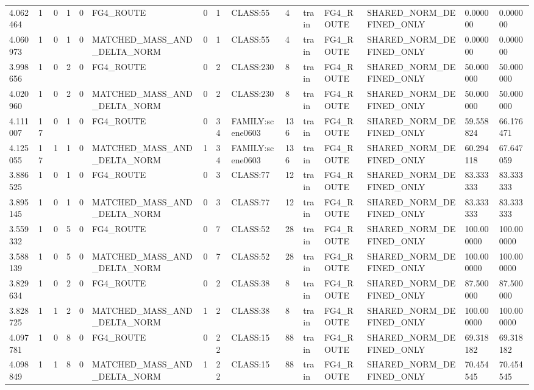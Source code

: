 \begin{tabular}{lllllllllllllll}
4.062464 & 1 & 0 & 1 & 0 & FG4\_ROUTE & 0 & 1 & CLASS:55 & 4 & train & FG4\_ROUTE & SHARED\_NORM\_DEFINED\_ONLY & 0.000000 & 0.000000 \\
4.060973 & 1 & 0 & 1 & 0 & MATCHED\_MASS\_AND\_DELTA\_NORM & 0 & 1 & CLASS:55 & 4 & train & FG4\_ROUTE & SHARED\_NORM\_DEFINED\_ONLY & 0.000000 & 0.000000 \\
3.998656 & 1 & 0 & 2 & 0 & FG4\_ROUTE & 0 & 2 & CLASS:230 & 8 & train & FG4\_ROUTE & SHARED\_NORM\_DEFINED\_ONLY & 50.000000 & 50.000000 \\
4.020960 & 1 & 0 & 2 & 0 & MATCHED\_MASS\_AND\_DELTA\_NORM & 0 & 2 & CLASS:230 & 8 & train & FG4\_ROUTE & SHARED\_NORM\_DEFINED\_ONLY & 50.000000 & 50.000000 \\
4.111007 & 17 & 0 & 1 & 0 & FG4\_ROUTE & 0 & 34 & FAMILY:scene0603 & 136 & train & FG4\_ROUTE & SHARED\_NORM\_DEFINED\_ONLY & 59.558824 & 66.176471 \\
4.125055 & 17 & 1 & 1 & 0 & MATCHED\_MASS\_AND\_DELTA\_NORM & 1 & 34 & FAMILY:scene0603 & 136 & train & FG4\_ROUTE & SHARED\_NORM\_DEFINED\_ONLY & 60.294118 & 67.647059 \\
3.886525 & 1 & 0 & 1 & 0 & FG4\_ROUTE & 0 & 3 & CLASS:77 & 12 & train & FG4\_ROUTE & SHARED\_NORM\_DEFINED\_ONLY & 83.333333 & 83.333333 \\
3.895145 & 1 & 0 & 1 & 0 & MATCHED\_MASS\_AND\_DELTA\_NORM & 0 & 3 & CLASS:77 & 12 & train & FG4\_ROUTE & SHARED\_NORM\_DEFINED\_ONLY & 83.333333 & 83.333333 \\
3.559332 & 1 & 0 & 5 & 0 & FG4\_ROUTE & 0 & 7 & CLASS:52 & 28 & train & FG4\_ROUTE & SHARED\_NORM\_DEFINED\_ONLY & 100.000000 & 100.000000 \\
3.588139 & 1 & 0 & 5 & 0 & MATCHED\_MASS\_AND\_DELTA\_NORM & 0 & 7 & CLASS:52 & 28 & train & FG4\_ROUTE & SHARED\_NORM\_DEFINED\_ONLY & 100.000000 & 100.000000 \\
3.829634 & 1 & 0 & 2 & 0 & FG4\_ROUTE & 0 & 2 & CLASS:38 & 8 & train & FG4\_ROUTE & SHARED\_NORM\_DEFINED\_ONLY & 87.500000 & 87.500000 \\
3.828725 & 1 & 1 & 2 & 0 & MATCHED\_MASS\_AND\_DELTA\_NORM & 1 & 2 & CLASS:38 & 8 & train & FG4\_ROUTE & SHARED\_NORM\_DEFINED\_ONLY & 100.000000 & 100.000000 \\
4.097781 & 1 & 0 & 8 & 0 & FG4\_ROUTE & 0 & 22 & CLASS:15 & 88 & train & FG4\_ROUTE & SHARED\_NORM\_DEFINED\_ONLY & 69.318182 & 69.318182 \\
4.098849 & 1 & 1 & 8 & 0 & MATCHED\_MASS\_AND\_DELTA\_NORM & 1 & 22 & CLASS:15 & 88 & train & FG4\_ROUTE & SHARED\_NORM\_DEFINED\_ONLY & 70.454545 & 70.454545 \\

\end{tabular}
